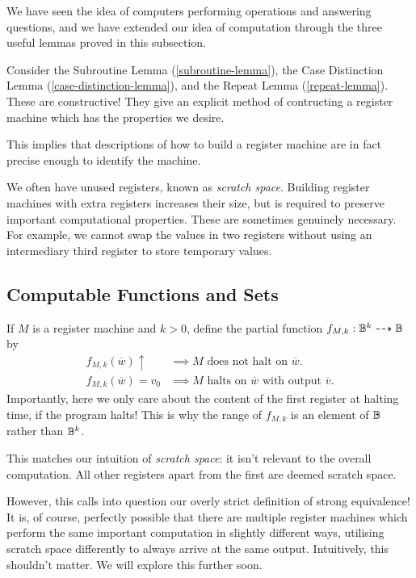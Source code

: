 \documentclass{article}
\begin{document}
We have seen the idea of computers performing operations and answering questions, and we have extended our idea of computation through the three useful lemmas proved in this subsection. 

\begin{remark}{}
	Consider the Subroutine Lemma (\ref{subroutine-lemma}), the Case Distinction Lemma (\ref{case-distinction-lemma}), and the Repeat Lemma (\ref{repeat-lemma}). These are constructive! They give an explicit method of contructing a register machine which has the properties we desire.
	    
	This implies that descriptions of how to build a register machine are in fact precise enough to identify the machine.
\end{remark}

We often have unused registers, known as \textit{scratch space}. Building register machines with extra registers increases their size, but is required to preserve important computational properties. These are sometimes genuinely necessary. For example, we cannot swap the values in two registers without using an intermediary third register to store temporary values.

\subsection{Computable Functions and Sets}

If $M$ is a register machine and $k > 0$, define the partial function $f_{M,k} : \mathbb{B}^{k} \dashrightarrow \mathbb{B}$ by
\begin{align*}
	f_{M,k} (\overline w) \uparrow & \implies \text{$M$ does not halt on $\overline w$.}                   \\
	f_{M,k} (\overline w) = v_0    & \implies \text{$M$ halts on $\overline w$ with output $\overline v$.} 
\end{align*}
Importantly, here we only care about the content of the first register at halting time, if the program halts! This is why the range of $f_{M,k}$ is an element of $\mathbb{B}$ rather than $\mathbb{B}^{k}$.

This matches our intuition of \textit{scratch space}: it isn't relevant to the overall computation. All other registers apart from the first are deemed scratch space. 

However, this calls into question our overly strict definition of strong equivalence! It is, of course, perfectly possible that there are multiple register machines which perform the same important computation in slightly different ways, utilising scratch space differently to always arrive at the same output. Intuitively, this shouldn't matter. We will explore this further soon.
\end{document}
